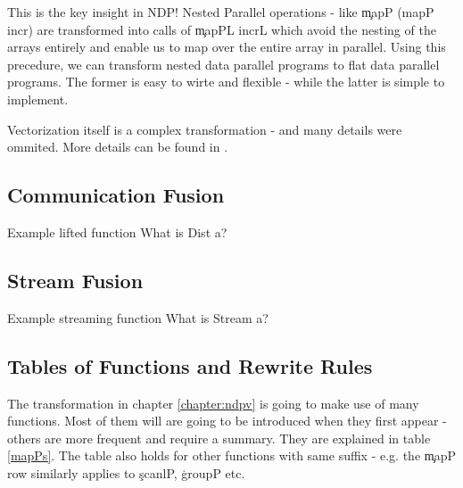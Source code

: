     This is the key insight in NDP! Nested Parallel operations - like \c{mapP (mapP incr)} are
    transformed into calls of \c{mapPL incrL} which avoid the nesting of
    the arrays entirely and enable us to map over the entire array in parallel.
    Using this precedure, we can transform nested data parallel programs
    to flat data parallel programs. The former is easy to wirte and flexible
    - while the latter is simple to implement.
            
    Vectorization itself is a complex transformation - and many details were ommited.
    More details can be found in \cite{Harness2008}.
    
  \subsection{Communication Fusion}
    Example lifted function
    What is Dist a?
    
  \subsection{Stream Fusion}
    Example streaming function
    What is Stream a?
    
  \subsection{Tables of Functions and Rewrite Rules}
    The transformation in chapter \ref{chapter:ndpv} is going to
    make use of many functions. Most of them will are going to be
    introduced when they first appear - others are more frequent
    and require a summary. They are explained in table \ref{mapPs}.
    The table also holds for other functions with same suffix - e.g.
    the \c{mapP} row similarly applies to \c{scanlP}, \c{groupP} etc.
    
